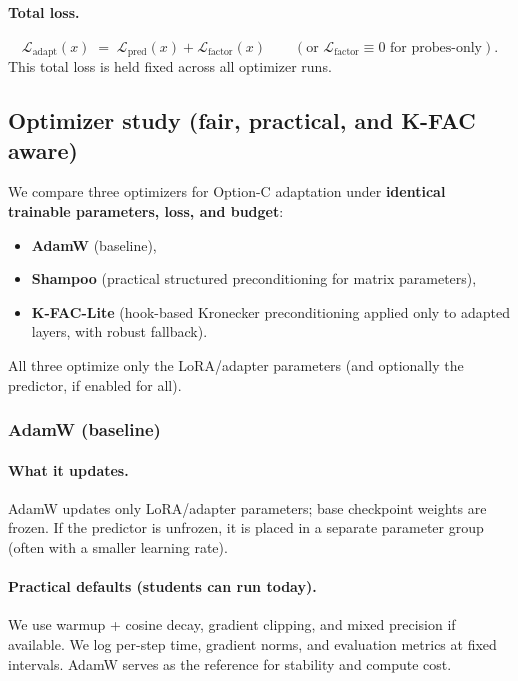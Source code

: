 \paragraph{Total loss.}
\[
\mathcal{L}_{\text{adapt}}(x)
\;=\;
\mathcal{L}_{\text{pred}}(x)
+
\mathcal{L}_{\text{factor}}(x)
\qquad
(\text{or } \mathcal{L}_{\text{factor}} \equiv 0 \text{ for probes-only}).
\]
This total loss is held fixed across all optimizer runs.

\subsection{Optimizer study (fair, practical, and K-FAC aware)}
\label{sec:optimizer_study_kfac}

We compare three optimizers for Option-C adaptation under \textbf{identical trainable parameters, loss, and budget}:
\begin{itemize}[leftmargin=*,itemsep=2pt]
\item \textbf{AdamW} (baseline),
\item \textbf{Shampoo} (practical structured preconditioning for matrix parameters),
\item \textbf{K-FAC-Lite} (hook-based Kronecker preconditioning applied only to adapted layers, with robust fallback).
\end{itemize}
All three optimize only the LoRA/adapter parameters (and optionally the predictor, if enabled for all).

\subsubsection{AdamW (baseline)}
\label{sec:adamw_plan}

\paragraph{What it updates.}
AdamW updates only LoRA/adapter parameters; base checkpoint weights are frozen. If the predictor is unfrozen, it is placed in a separate parameter group (often with a smaller learning rate).

\paragraph{Practical defaults (students can run today).}
We use warmup + cosine decay, gradient clipping, and mixed precision if available. We log per-step time, gradient norms, and evaluation metrics at fixed intervals. AdamW serves as the reference for stability and compute cost.

